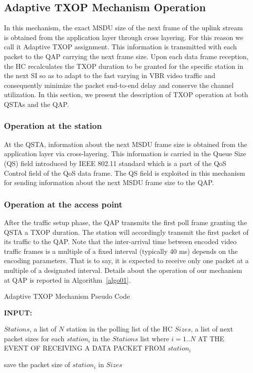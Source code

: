 \documentclass[a4paper, conference]{IEEEtran}
\begin{document}
\subsection{Adaptive TXOP Mechanism Operation}
In this mechanism, the exact MSDU size of the next frame of the uplink stream is obtained from the application layer through cross layering. For this reason we call it Adaptive TXOP assignment. This information is transmitted with each packet to the QAP carrying the next frame size. Upon each data frame reception, the HC recalculates the TXOP duration to be granted for the specific station in the next SI so as to adapt to the fast varying in VBR video traffic and consequently minimize the packet end-to-end delay and conserve the channel utilization. In this section, we present the description of TXOP operation at both QSTAs and the QAP.
\subsubsection{Operation at the station}
At the QSTA, information about the next MSDU frame size is obtained from the application layer via cross-layering. This information is carried in the Queue  Size (QS) field introduced by IEEE 802.11 standard \cite{IEEEStandard2007} which is a part of the QoS Control field of the QoS data frame. The QS field is exploited in this mechanism for sending information about the next MSDU frame size to the QAP.
\subsubsection{Operation at the access point} 
After the traffic setup phase, the QAP transmits the first poll frame granting the QSTA a TXOP duration. The station will accordingly transmit the first packet of its traffic to the QAP. Note that the inter-arrival time between encoded video traffic frames is a multiple of a fixed interval (typically 40 ms) depends on the encoding parameters. That is to say, it is expected to receive only one packet at a multiple of a designated interval. Details about the operation of our mechanism at QAP is reported in Algorithm~\ref{algo01}.
\begin{algorithm}
\caption{Adaptive TXOP Mechanism Pseudo Code}\label{algo01}
\textbf{INPUT:}

$Stations$, a list of $N$ station in the polling list of the HC\;
$Sizes$, a list of next packet sizes for each $station_{i}$ in the $Stations$ list where $i=1..N$\;
AT THE EVENT OF RECEIVING A DATA PACKET FROM $station_{i}$

save the packet size of $station_{i}$ in $Sizes$

\end{algorithm}\DecMargin{1em}
\end{document}

